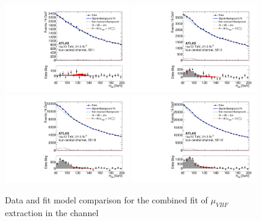 \begin{figure}[htbp]
  \centering
  \includegraphics[width=0.48\textwidth]{figures/VBF/comb_vbfonly_testVBF_ICHEP_4cen_SRI_vbfincl.pdf}
 \includegraphics[width=0.48\textwidth]{figures/VBF/comb_vbfonly_testVBF_ICHEP_4cen_SRII_vbfincl.pdf}\\
 \includegraphics[width=0.48\textwidth]{figures/VBF/comb_vbfonly_testVBF_ICHEP_4cen_SRIII_vbfincl.pdf}
 \includegraphics[width=0.48\textwidth]{figures/VBF/comb_vbfonly_testVBF_ICHEP_4cen_SRIV_vbfincl.pdf}\\

\caption{Data and fit model comparison for the combined fit of $\mu_{VBF}$ extraction in the \fourcentral channel}
  \label{fig:higgsfit_4cen}
\end{figure}



